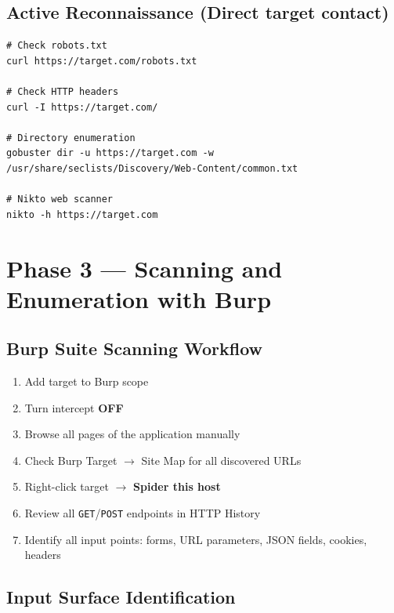\subsection{Active Reconnaissance (Direct target contact)}

\begin{lstlisting}[style=terminal, caption={Active recon commands}]
# Check robots.txt
curl https://target.com/robots.txt

# Check HTTP headers
curl -I https://target.com/

# Directory enumeration
gobuster dir -u https://target.com -w /usr/share/seclists/Discovery/Web-Content/common.txt

# Nikto web scanner
nikto -h https://target.com
\end{lstlisting}

\section{Phase 3 — Scanning and Enumeration with Burp}

\subsection{Burp Suite Scanning Workflow}

\begin{enumerate}
  \item Add target to Burp scope
  \item Turn intercept \textbf{OFF}
  \item Browse all pages of the application manually
  \item Check Burp Target $\to$ Site Map for all discovered URLs
  \item Right-click target $\to$ \textbf{Spider this host}
  \item Review all \texttt{GET}/\texttt{POST} endpoints in HTTP History
  \item Identify all input points: forms, URL parameters, JSON fields, cookies, headers
\end{enumerate}

\subsection{Input Surface Identification}

